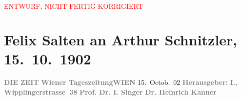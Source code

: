 
\begin{center}
            \textcolor{red}{ENTWURF, NICHT FERTIG KORRIGIERT}
                      \end{center}
            
         
         \renewcommand{\erwaehntePersonen}{Personen:  Forster, Hugo Ganz, Ernst Gettke, Theodor Herzl, Heinrich Kanner, Raphael Löwenfeld, Paul Paschen, Isidor Singer, Siegfried Trebitsch, Jakob Wassermann}
         \renewcommand{\erwaehnteInstitutionen}{Institutionen: Die Zeit, Raimund-Theater, S. Fischer Verlag, Schiller-Theater}
         \renewcommand{\erwaehnteOrte}{Orte: Berlin, Wien, Wipplingerstraße}
         \renewcommand{\erwaehnteWerke}{Werke: Altneuland. Roman, Der Moloch, Die Zeit, Fünfkreuzertanz, »Altneuland«}
               \section[Felix Salten an Arthur Schnitzler, 15. 10. 1902]{ Felix Salten an Arthur Schnitzler, 15. 10. 1902}\nopagebreak{}\rehead{ }\begin{ledgroupsized}[t]{13cm}\normalsize\beginnumbering \toendnotes[C]{\smallbreak\pagebreak[2]} 
\toendnotes[C]{\smallbreak}\pstart
           \noindent{}{\pb}\textcolor{gray}{\textbf{DIE}}\pend
           \pstart
           \textcolor{gray}{\textbf{ZEIT}}\pend
           \pstart
           \textcolor{gray}{\textbf{Wiener Tageszeitung}}\hfill \textcolor{gray}{\textbf{WIEN}}{ }15. Octob. 02\pend
           \pstart
           \textcolor{gray}{\textbf{Herausgeber: }}\hfill \textcolor{gray}{\textbf{I., Wipplingerstrasse 38}}\pend
           \pstart
           \textcolor{gray}{\textbf{Prof. Dr. I. Singer}}\pend
           \pstart
           \textcolor{gray}{\textbf{Dr. Heinrich Kanner}}\pend

\end{ledgroupsized}
